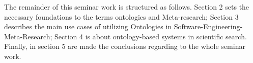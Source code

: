 The remainder of this seminar work is structured as follows. Section 2 sets the necessary foundations to the terms ontologies and Meta-research; Section 3 describes the main use cases of utilizing Ontologies in Software-Engineering-Meta-Research; Section 4 is about ontology-based systems in scientific search. Finally, in section 5 are made the conclusions regarding to the whole seminar work.               